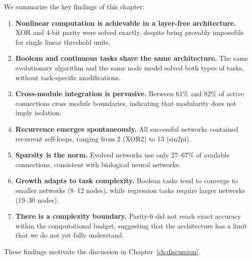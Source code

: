 We summarize the key findings of this chapter:

\begin{enumerate}
  \item \textbf{Nonlinear computation is achievable in a layer-free
    architecture.} XOR and 4-bit parity were solved exactly, despite
    being provably impossible for single linear threshold units.

  \item \textbf{Boolean and continuous tasks share the same
    architecture.} The same evolutionary algorithm and the same node
    model solved both types of tasks, without task-specific
    modifications.

  \item \textbf{Cross-module integration is pervasive.} Between 61\%
    and 82\% of active connections cross module boundaries, indicating
    that modularity does not imply isolation.

  \item \textbf{Recurrence emerges spontaneously.} All successful
    networks contained recurrent self-loops, ranging from 2 (XOR2) to
    13 (sin2pi).

  \item \textbf{Sparsity is the norm.} Evolved networks use only
    27--67\% of available connections, consistent with biological
    neural networks.

  \item \textbf{Growth adapts to task complexity.} Boolean tasks tend
    to converge to smaller networks (8--12 nodes), while regression
    tasks require larger networks (19--30 nodes).

  \item \textbf{There is a complexity boundary.} Parity-6 did not
    reach exact accuracy within the computational budget, suggesting
    that the architecture has a limit that we do not yet fully
    understand.
\end{enumerate}

These findings motivate the discussion in Chapter~\ref{ch:discussion}.
